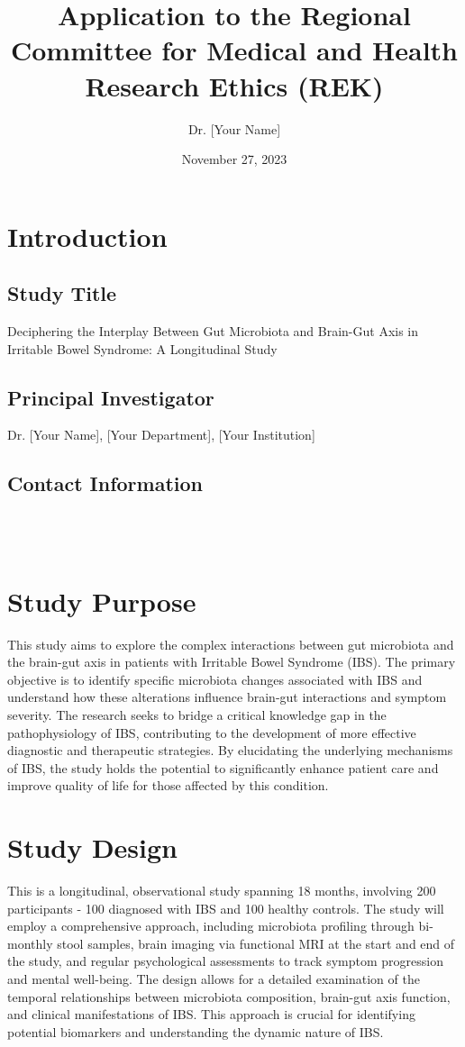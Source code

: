 \documentclass[11pt,a4paper]{article}
\title{Application to the Regional Committee for Medical and Health Research Ethics (REK)}
\author{Dr. [Your Name]}
\date{November 27, 2023}
\begin{document}
\maketitle

\section{Introduction}
\subsection{Study Title}
Deciphering the Interplay Between Gut Microbiota and Brain-Gut Axis in Irritable Bowel Syndrome: A Longitudinal Study

\subsection{Principal Investigator}
Dr. [Your Name], [Your Department], [Your Institution]

\subsection{Contact Information}
 \\
 \\

\section{Study Purpose}
This study aims to explore the complex interactions between gut microbiota and the brain-gut axis in patients with Irritable Bowel Syndrome (IBS). The primary objective is to identify specific microbiota changes associated with IBS and understand how these alterations influence brain-gut interactions and symptom severity. The research seeks to bridge a critical knowledge gap in the pathophysiology of IBS, contributing to the development of more effective diagnostic and therapeutic strategies. By elucidating the underlying mechanisms of IBS, the study holds the potential to significantly enhance patient care and improve quality of life for those affected by this condition.

\section{Study Design}
This is a longitudinal, observational study spanning 18 months, involving 200 participants - 100 diagnosed with IBS and 100 healthy controls. The study will employ a comprehensive approach, including microbiota profiling through bi-monthly stool samples, brain imaging via functional MRI at the start and end of the study, and regular psychological assessments to track symptom progression and mental well-being. The design allows for a detailed examination of the temporal relationships between microbiota composition, brain-gut axis function, and clinical manifestations of IBS. This approach is crucial for identifying potential biomarkers and understanding the dynamic nature of IBS.
\end{document}
